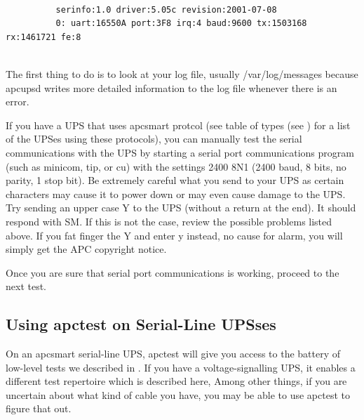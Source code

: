 {{{{{{{{{{\begin{itemize}
\footnotesize
\begin{verbatim}
          
          serinfo:1.0 driver:5.05c revision:2001-07-08
          0: uart:16550A port:3F8 irq:4 baud:9600 tx:1503168 rx:1461721 fe:8
     
\end{verbatim}
\normalsize

\end{itemize}

The first thing to do is to look at your log file, usually /var/log/messages
because apcupsd writes more detailed information to the log file whenever
there is an error.  

If you have a UPS that uses apcsmart protcol (see table of types (see 
) for a list of the UPSes using
these protocols), you can manually test the serial communications with the UPS
by starting a serial port communications program (such as minicom, tip, or cu)
with the settings 2400 8N1 (2400 baud, 8 bits, no parity, 1 stop bit). Be
extremely careful what you send to your UPS as certain characters may cause it
to power down or may even cause damage to the UPS. Try sending an upper case Y
to the UPS (without a return at the end). It should respond with SM. If this
is not the case, review the possible problems listed above. If you fat finger
the Y and enter y instead, no cause for alarm, you will simply get the APC
copyright notice.  

Once you are sure that serial port communications is working, proceed to the
next test. 

\label{Using-apctest-on-Serial_002dLine-UPSses}

\subsection*{Using apctest on Serial-Line UPSses}

\label{index-apctest-222}
\label{index-Testing_002c-with-apctest-223}
On an apcsmart serial-line UPS, apctest will give you access to the battery of
low-level tests we described in 
.  If you have a voltage-signalling UPS, it
enables a different test repertoire which is described here, Among other
things, if you are uncertain about what kind of cable you have, you may be
able to use apctest to figure that out.  

}}}}}}}}}}
